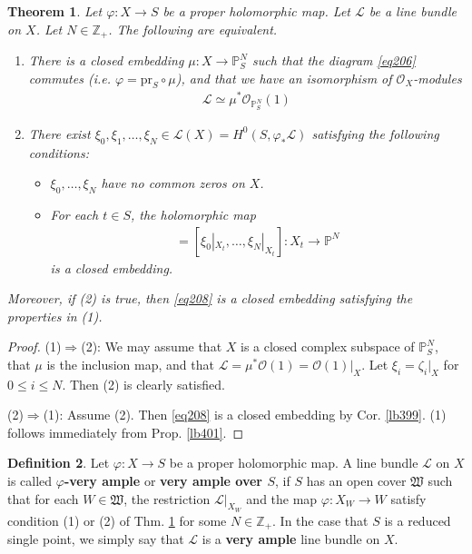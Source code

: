 \documentclass[12pt,b5paper,notitlepage]{report}
\theoremstyle{definition}
\newtheorem{df}{Definition}[section]
\theoremstyle{plain}
\newtheorem{thm}[df]{Theorem}
\newcommand{\fk}{\mathfrak}
\newcommand{\scr}{\mathscr}
\newcommand{\blt}{\bullet}
\newcommand{\Zbb}{\mathbb Z}
\newcommand{\Pbb}{\mathbb P}
\newcommand{\pr}{\mathrm {pr}}
\numberwithin{equation}{section}
\begin{document}
\begin{thm}\label{lb402}
Let $\varphi:X\rightarrow S$ be a proper holomorphic map. Let $\scr L$ be a line bundle on $X$. Let $N\in\Zbb_+$. The following are equivalent.
\begin{enumerate}[label=(\arabic*)]
\item There is a closed embedding $\mu:X\rightarrow\Pbb^N_S$ such that the diagram \eqref{eq206} commutes (i.e. $\varphi=\pr_S\circ\mu$), and that we have an isomorphism of $\scr O_X$-modules
\begin{align*}
\scr L\simeq \mu^*\scr O_{\Pbb^N_S}(1)
\end{align*}
\item There exist ${\xi_0,\xi_1,\dots,\xi_N}\in \scr L(X)=H^0(S,\varphi_*\scr L)$ satisfying the following conditions:
\begin{itemize}
\item[(2a)] $\xi_0,\dots,\xi_N$ have no common zeros on $X$. 
\item[(2b)] For each $t\in S$, the holomorphic map
\begin{gather}
[\xi_\blt|_{X_t}]=[\xi_0|_{X_t},\dots,\xi_N|_{X_t}]:X_t\rightarrow \Pbb^N  \label{eq207}
\end{gather}
is a closed embedding.
\end{itemize}
\end{enumerate}
Moreover, if (2) is true, then \eqref{eq208} is a closed embedding satisfying the properties in (1).
\end{thm}

\begin{proof}
(1)$\Rightarrow$(2): We may assume that $X$ is a closed complex subspace of $\Pbb^N_S$, that $\mu$ is the inclusion map, and that $\scr L=\mu^*\scr O(1)=\scr O(1)|_X$. Let $\xi_i=\zeta_i|_X$ for $0\leq i\leq N$. Then (2) is clearly satisfied.

(2)$\Rightarrow$(1): Assume (2). Then \eqref{eq208} is a closed embedding by Cor. \ref{lb399}.  (1) follows immediately from Prop. \ref{lb401}.
\end{proof}






\begin{df}
Let $\varphi:X\rightarrow S$ be a proper holomorphic map. A line bundle $\scr L$ on $X$ is called \textbf{$\varphi$-very ample} or \textbf{very ample over $S$},  if $S$ has an open cover $\fk W$ such that for each $W\in\fk W$, the restriction $\scr L|_{X_W}$ and the map $\varphi:X_W\rightarrow W$ satisfy condition (1) or (2) of Thm. \ref{lb402} for some $N\in\Zbb_+$. In the case that $S$ is a reduced single point, we simply say that $\scr L$ is a \textbf{very ample} line bundle on $X$.
\end{df}
\end{document}

